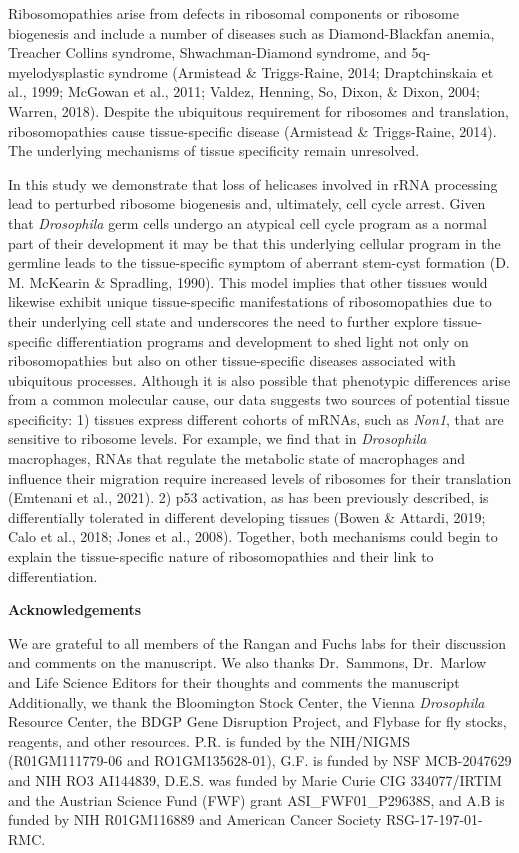 \documentclass[12pt,oneside]{reedthesis}
\begin{document}
Ribosomopathies arise from defects in ribosomal components or ribosome
biogenesis and include a number of diseases such as Diamond-Blackfan
anemia, Treacher Collins syndrome, Shwachman-Diamond syndrome, and
5q-myelodysplastic syndrome (Armistead \& Triggs-Raine, 2014; Draptchinskaia et al., 1999; McGowan et al., 2011; Valdez, Henning, So, Dixon, \& Dixon, 2004; Warren, 2018).
Despite the ubiquitous requirement for ribosomes and translation,
ribosomopathies cause tissue-specific disease (Armistead \& Triggs-Raine, 2014). The
underlying mechanisms of tissue specificity remain unresolved.

In this study we demonstrate that loss of helicases involved in rRNA
processing lead to perturbed ribosome biogenesis and, ultimately, cell
cycle arrest. Given that \emph{Drosophila} germ cells undergo an atypical
cell cycle program as a normal part of their development it may be that
this underlying cellular program in the germline leads to the
tissue-specific symptom of aberrant stem-cyst formation
(D. M. McKearin \& Spradling, 1990). This model implies that other tissues would
likewise exhibit unique tissue-specific manifestations of
ribosomopathies due to their underlying cell state and underscores the
need to further explore tissue-specific differentiation programs and
development to shed light not only on ribosomopathies but also on other
tissue-specific diseases associated with ubiquitous processes. Although
it is also possible that phenotypic differences arise from a common
molecular cause, our data suggests two sources of potential tissue
specificity: 1) tissues express different cohorts of mRNAs, such as
\emph{Non1}, that are sensitive to ribosome levels. For example, we find that
in \emph{Drosophila} macrophages, RNAs that regulate the metabolic state of
macrophages and influence their migration require increased levels of
ribosomes for their translation (Emtenani et al., 2021).
2) p53 activation, as has been previously described, is differentially
tolerated in different developing tissues
(Bowen \& Attardi, 2019; Calo et al., 2018; Jones et al., 2008). Together, both
mechanisms could begin to explain the tissue-specific nature of
ribosomopathies and their link to differentiation.

\textbf{Acknowledgements}

We are grateful to all members of the Rangan and Fuchs labs for their
discussion and comments on the manuscript. We also thanks Dr.~Sammons,
Dr.~Marlow and Life Science Editors for their thoughts and comments the
manuscript Additionally, we thank the Bloomington Stock Center, the
Vienna \emph{Drosophila} Resource Center, the BDGP Gene Disruption Project,
and Flybase for fly stocks, reagents, and other resources. P.R. is
funded by the NIH/NIGMS (R01GM111779-06 and RO1GM135628-01), G.F. is
funded by NSF MCB-2047629 and NIH RO3 AI144839, D.E.S. was funded by
Marie Curie CIG 334077/IRTIM and the Austrian Science Fund (FWF) grant
ASI\_FWF01\_P29638S, and A.B is funded by NIH R01GM116889 and American
Cancer Society RSG-17-197-01-RMC.
\end{document}
